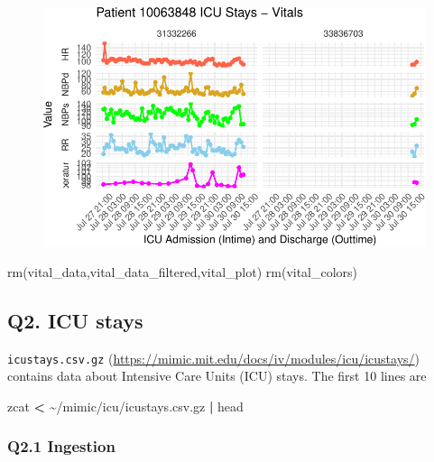 \documentclass[
]{article}
\newenvironment{Shaded}{\begin{snugshade}}{\end{snugshade}}
\newcommand{\FunctionTok}[1]{\textcolor[rgb]{0.00,0.00,0.00}{#1}}
\newcommand{\KeywordTok}[1]{\textcolor[rgb]{0.13,0.29,0.53}{\textbf{#1}}}
\newcommand{\NormalTok}[1]{\textcolor[rgb]{0.00,0.00,0.00}{#1}}
\newcommand{\OperatorTok}[1]{\textcolor[rgb]{0.81,0.36,0.00}{\textbf{#1}}}
\begin{document}
\begin{figure}[H]

{\centering \includegraphics{hw3_files/figure-pdf/unnamed-chunk-15-1.pdf}

}

\end{figure}

\begin{Shaded}
\begin{Highlighting}[]
\FunctionTok{rm}\NormalTok{(vital\_data,vital\_data\_filtered,vital\_plot)}
\FunctionTok{rm}\NormalTok{(vital\_colors)}
\end{Highlighting}
\end{Shaded}

\hypertarget{q2.-icu-stays}{%
\subsection{Q2. ICU stays}\label{q2.-icu-stays}}

\texttt{icustays.csv.gz}
(\url{https://mimic.mit.edu/docs/iv/modules/icu/icustays/}) contains
data about Intensive Care Units (ICU) stays. The first 10 lines are

\begin{Shaded}
\begin{Highlighting}[]
\FunctionTok{zcat} \OperatorTok{\textless{}}\NormalTok{ \textasciitilde{}/mimic/icu/icustays.csv.gz }\KeywordTok{|} \FunctionTok{head}
\end{Highlighting}
\end{Shaded}

\hypertarget{q2.1-ingestion}{%
\subsubsection{Q2.1 Ingestion}\label{q2.1-ingestion}}
\end{document}

